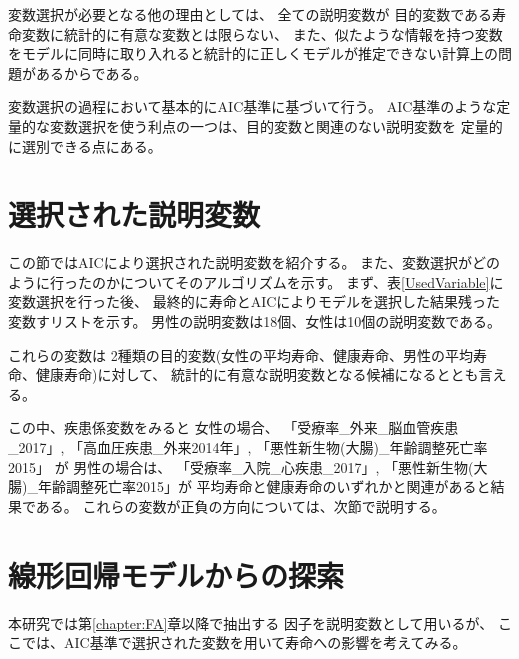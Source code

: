 \documentclass[a4j,11pt,mc]{jreport}
\newcommand{\tb}[1]{\textcolor{blue}{#1}} %
\begin{document}
変数選択が必要となる他の理由としては、
全ての説明変数が
目的変数である寿命変数に統計的に有意な変数とは限らない、
また、似たような情報を持つ変数をモデルに同時に取り入れると統計的に正しくモデルが推定できない計算上の問題があるからである。

変数選択の過程において基本的にAIC基準に基づいて行う。
AIC基準のような定量的な変数選択を使う利点の一つは、目的変数と関連のない説明変数を
定量的に選別できる点にある。


%
%
%


\section{選択された説明変数}

この節ではAICにより選択された説明変数を紹介する。
また、変数選択がどのように行ったのかについてそのアルゴリズムを示す。
まず、表\ref{UsedVariable}に変数選択を行った後、
最終的に寿命とAICによりモデルを選択した結果残った変数すリストを示す。
男性の説明変数は18個、女性は10個の説明変数である。


これらの変数は
2種類の目的変数(女性の平均寿命、健康寿命、男性の平均寿命、健康寿命)に対して、
統計的に有意な説明変数となる候補になるととも言える。



この中、疾患係変数をみると
女性の場合、
「受療率\_外来\_脳血管疾患\_2017」,
「高血圧疾患\_外来2014年」,
「悪性新生物(大腸)\_年齢調整死亡率2015」
が
男性の場合は、
「受療率\_入院\_心疾患\_2017」,
「悪性新生物(大腸)\_年齢調整死亡率2015」が
平均寿命と健康寿命のいずれかと関連があると結果である。
これらの変数が正負の方向については、次節で説明する。






%


\section{線形回帰モデルからの探索}

本研究では第\ref{chapter:FA}章以降で抽出する
因子を説明変数として用いるが、
ここでは、AIC基準で選択された変数を用いて寿命への影響を考えてみる。
\end{document}

